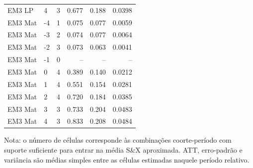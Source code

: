\begin{table}[!htbp]
\begin{tabular}{llrrrr}
EM3 LP & 4 & 3 & 0.677 & 0.188 & 0.0398 \\
EM3 Mat & -4 & 1 & 0.075 & 0.077 & 0.0059 \\
EM3 Mat & -3 & 2 & 0.074 & 0.077 & 0.0064 \\
EM3 Mat & -2 & 3 & 0.073 & 0.063 & 0.0041 \\
EM3 Mat & -1 & 0 & -- & -- & -- \\
EM3 Mat & 0 & 4 & 0.389 & 0.140 & 0.0212 \\
EM3 Mat & 1 & 4 & 0.551 & 0.154 & 0.0281 \\
EM3 Mat & 2 & 4 & 0.720 & 0.184 & 0.0385 \\
EM3 Mat & 3 & 3 & 0.733 & 0.204 & 0.0483 \\
EM3 Mat & 4 & 3 & 0.833 & 0.208 & 0.0484 \\
\bottomrule
\end{tabular}
\begin{flushleft}
\footnotesize Nota: o número de células corresponde às combinações coorte-período com suporte suficiente para entrar na média S\&X aproximada. ATT, erro-padrão e variância são médias simples entre as células estimadas naquele período relativo.
\end{flushleft}
\end{table}
